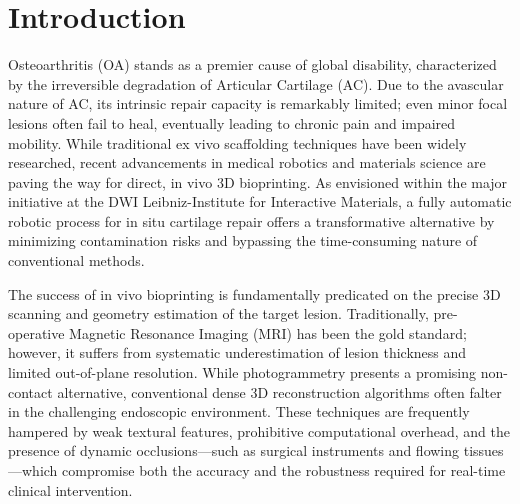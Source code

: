 \chapter{Introduction}
\label{chap:introduction}

Osteoarthritis (OA) stands as a premier cause of global disability, characterized by the irreversible degradation of Articular Cartilage (AC). Due to the avascular nature of AC, its intrinsic repair capacity is remarkably limited; even minor focal lesions often fail to heal, eventually leading to chronic pain and impaired mobility. While traditional ex vivo scaffolding techniques have been widely researched, recent advancements in medical robotics and materials science are paving the way for direct, in vivo 3D bioprinting. As envisioned within the major initiative at the DWI Leibniz-Institute for Interactive Materials, a fully automatic robotic process for in situ cartilage repair offers a transformative alternative by minimizing contamination risks and bypassing the time-consuming nature of conventional methods.\cite{Yoo2024}

The success of in vivo bioprinting is fundamentally predicated on the precise 3D scanning and geometry estimation of the target lesion. Traditionally, pre-operative Magnetic Resonance Imaging (MRI) has been the gold standard; however, it suffers from systematic underestimation of lesion thickness and limited out-of-plane resolution. While photogrammetry presents a promising non-contact alternative, conventional dense 3D reconstruction algorithms often falter in the challenging endoscopic environment. These techniques are frequently hampered by weak textural features, prohibitive computational overhead, and the presence of dynamic occlusions---such as surgical instruments and flowing tissues---which compromise both the accuracy and the robustness required for real-time clinical intervention.\cite{Yoo2024}

